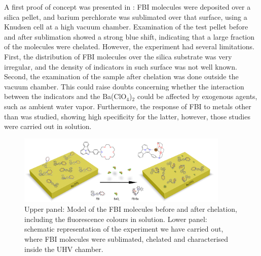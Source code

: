 \documentclass[aps,prl,reprint,longbibliography,superscriptaddress, english]{revtex4-1}
\begin{document}
A first proof of concept was presented in \cite{rivilla_fluorescent_2020}: FBI molecules were deposited over a silica pellet, and barium perchlorate was sublimated over that surface, using a Knudsen cell at a high vacuum chamber. Examination of the test pellet before and after sublimation showed a strong blue shift, indicating that a large fraction of the molecules were chelated. However, the experiment had several limitations. First, the distribution of FBI molecules over the silica substrate was very irregular, and the density of indicators in such surface was not well known. Second, the examination of the sample after chelation was done outside the vacuum chamber. This could raise doubts concerning whether the interaction between the indicators and the Ba(ClO$_4$)$_2$ could be affected by exogenous agents, such as ambient water vapor.  Furthermore, the response of FBI to metals other than \Bapp was studied, showing high specificity for the latter, however, those studies were carried out in solution.


 
 \begin{figure}[ht!]
	\includegraphics[width=0.9\textwidth]{figures/figura_1a.jpg}
	\caption{\label{ModeloFBI} 
    Upper panel: Model of the FBI molecules before and after chelation, including the fluorescence colours in solution. Lower panel: schematic representation of the experiment we have carried out, where FBI molecules were sublimated, chelated and characterised inside the UHV chamber.}
\end{figure}  
\end{document}
